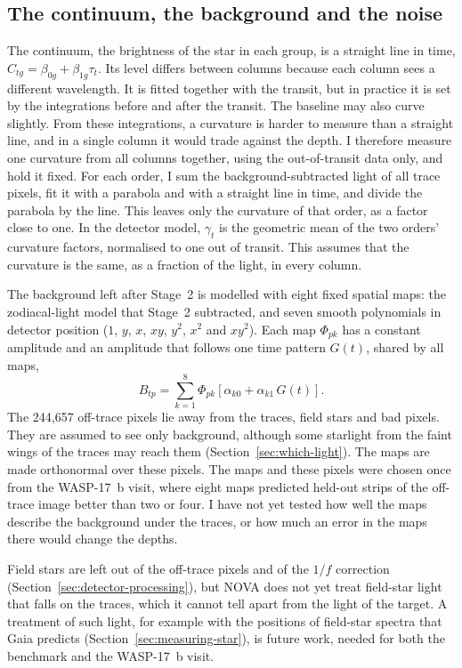 \subsection{The continuum, the background and the noise}
\label{sec:continuum}

The continuum, the brightness of the star in each group, is a straight line in time,
$C_{tg}=\beta_{0g}+\beta_{1g}\tau_t$. Its level differs between columns
because each column sees a different wavelength. It is fitted together with
the transit, but in practice it is set by the integrations before and after
the transit. The baseline may also curve slightly. From these integrations, a curvature is harder
to measure than a straight line, and in a single column it would trade against the depth. I therefore
measure one curvature from all columns together, using the out-of-transit data
only, and hold it fixed. For each order, I sum the background-subtracted light
of all trace pixels, fit it with a parabola and with a straight line in time,
and divide the parabola by the line. This leaves only the curvature of that
order, as a factor close to one. In the detector model, $\gamma_t$ is the geometric mean of the two
orders' curvature factors, normalised to one out of transit. This assumes that the curvature is the same, as a fraction of
the light, in every column.

The background left after Stage~2 is modelled with eight fixed spatial maps:
the zodiacal-light model that Stage~2 subtracted, and seven smooth polynomials
in detector position ($1$, $y$, $x$, $xy$, $y^2$, $x^2$ and $xy^2$). Each map
$\Phi_{pk}$ has a constant amplitude and an amplitude that follows one time
pattern $G(t)$, shared by all maps,
\begin{equation}
 B_{tp}=\sum_{k=1}^{8}\Phi_{pk}
 \left[\alpha_{k0}+\alpha_{k1}\,G(t)\right].
 \label{eq:background-model}
\end{equation}
The 244,657 off-trace pixels lie away from the traces, field stars and bad pixels. They are assumed to see only background, although some starlight from the faint wings of the traces may reach them (Section~\ref{sec:which-light}). The
maps are made orthonormal over these pixels. The maps and these pixels were
chosen once from the WASP-17~b visit, where eight maps predicted held-out strips
of the off-trace image better than two or four. I have not yet tested how well
the maps describe the background under the traces, or how much an error in the
maps there would change the depths.

Field stars are left out of the off-trace pixels and of the $1/f$ correction
(Section~\ref{sec:detector-processing}), but NOVA does not yet treat
field-star light that falls on the traces, which it cannot tell apart from the
light of the target. A treatment of such light, for example with the positions
of field-star spectra that Gaia predicts (Section~\ref{sec:measuring-star}),
is future work, needed for both the benchmark and the WASP-17~b visit.

